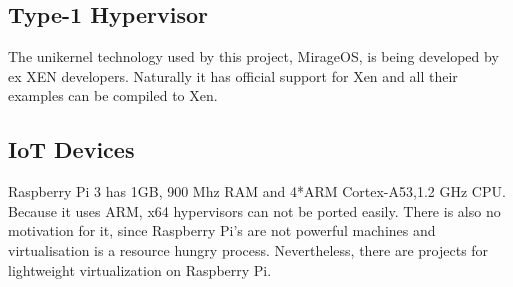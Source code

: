 \subsection{Type-1 Hypervisor}
The unikernel technology used by this project, MirageOS, is being developed by ex XEN developers. Naturally it has official support for Xen and all their examples can be compiled to Xen. 
\subsection{IoT Devices}

Raspberry Pi 3 has 1GB, 900 Mhz RAM and 4*ARM Cortex-A53,1.2 GHz CPU. Because it uses ARM, x64 hypervisors can not be ported easily. There is also no motivation for it, since Raspberry Pi's are not powerful machines and virtualisation is a resource hungry process. Nevertheless, there are projects for lightweight virtualization on Raspberry Pi.

